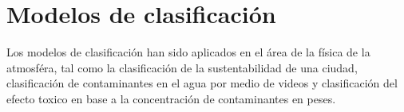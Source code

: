 \section{Modelos de clasificación}

Los modelos de clasificación han sido aplicados en el área de la física de la atmosféra, tal como la clasificación de la sustentabilidad de una ciudad\cite{Haldorai_2020}, clasificación de contaminantes en el agua por medio de videos\cite{KangSeung_2021} y clasificación del efecto toxico en base a la concentración de contaminantes en peses\cite{Verhaar_2000}.




